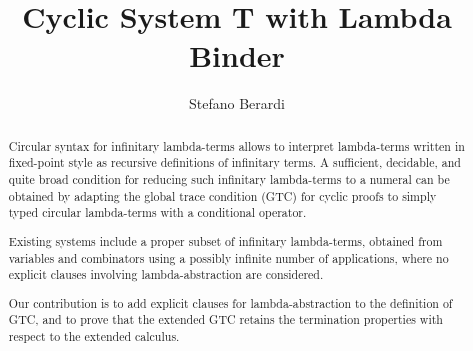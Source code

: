 \documentclass[a4paper,anonymous]{lipics-v2021}
\title{Cyclic System T with Lambda Binder}
\author
    {Stefano Berardi}
    {Computer Science Department, Turin University, Torino, Italy}
    {} %
    {0000-0001-5427-0020} %
    {} %
\begin{document}
\maketitle

\begin{abstract}
%
Circular syntax for infinitary lambda-terms allows to interpret lambda-terms written in fixed-point style as recursive definitions of infinitary terms. A sufficient, decidable, and quite broad condition for reducing such infinitary lambda-terms to a numeral can be obtained by adapting the global trace condition (GTC) for cyclic proofs to simply typed circular lambda-terms with a conditional operator. 

Existing systems include a proper subset of infinitary lambda-terms, obtained from variables and combinators using a possibly infinite number of applications, where no explicit clauses involving lambda-abstraction are considered. 

Our contribution is to add explicit clauses for lambda-abstraction to the definition of GTC, and to prove that the extended GTC retains the termination properties with respect to the extended calculus.
\end{abstract}
\end{document}

